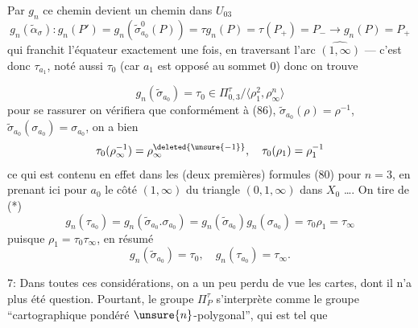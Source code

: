 Par $g_n$ ce chemin devient un chemin dans $U_{03}$
\[
g_n(\widetilde\alpha_\sigma):
g_n(P')=g_n(\widetilde\sigma^0_{a_0}(P))=\tau g_n(P)=\tau(P_+)=P_-
\longrightarrow g_n(P)=P_+
\]
qui franchit l'équateur  exactement une fois, en traversant l'arc $\widehat{(1,\infty)}$ — c'est donc $\tau_{a_1}$, noté aussi $\tau_0$ (car $a_1$ est opposé au sommet $0$) donc on trouve


\[
\tag{*} g_n(\widetilde\sigma_{a_0})=\tau_0\in
\Pi_{0,3}^{\tau}/\langle\rho_1^2,\rho_\infty^n\rangle
\]
pour se rassurer on vérifiera que conformément à (86), $\widetilde\sigma_{a_0}(\rho)=\rho^{-1}$, $\widetilde\sigma_{a_0}(\sigma_{a_0})=\sigma_{a_0}$, on a bien
\[
\tau_0(\rho_\infty^{-1})=\rho_\infty^{\deleted{\unsure{-1}}},\quad
\tau_0(\rho_1)=\rho_1^{-1}
\]
ce qui est contenu en effet dans les (deux premières) formules (80) pour $n=3$, en prenant ici pour $a_0$ le côté $(1,\infty)$ du triangle $(0,1,\infty)$  dans $X_0$ \ldots. On tire de  (*)
\[
g_n(\tau_{a_0})=g_n(\widetilde\sigma_{a_0}.\sigma_{a_0})
=g_n(\widetilde\sigma_{a_0})g_n(\sigma_{a_0})
=\tau_0\rho_1=\tau_\infty
\]
puisque $\rho_1=\tau_0\tau_\infty$,  en résumé
\[
\tag{100}
g_n(\widetilde\sigma_{a_0})=\tau_0,\quad g_n(\tau_{a_0})=\tau_\infty.
\]


7: Dans toutes ces considérations,  on a un peu perdu de vue les cartes, dont il n'a plus été question. Pourtant, le groupe $\Pi_P^\tau$ s'interprète comme le groupe ``cartographique pondéré $\unsure{n}$-polygonal'', qui est tel que

